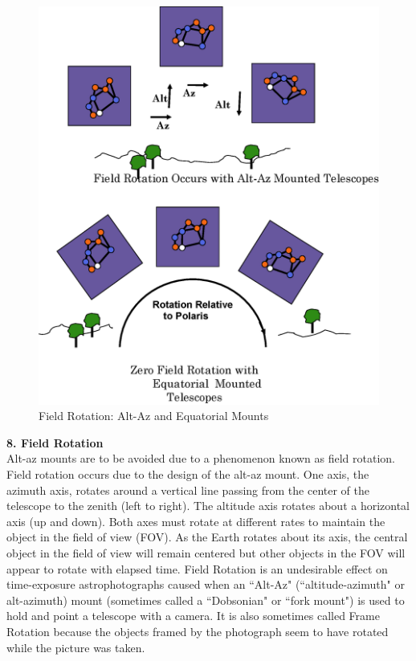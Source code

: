 \documentclass[a4paper,12pt]{extarticle}
\begin{document}
\begin{figure}
	\centering
	\includegraphics[width=\linewidth]{fieldrot.eps}
	\vspace{-1.5cm}
	\caption{Field Rotation: Alt-Az and Equatorial Mounts}
\end{figure}

\textbf{8. Field Rotation}\\

Alt-az mounts are to be avoided due to a phenomenon
known as field rotation. Field rotation occurs due to
the design of the alt-az mount. One axis, the azimuth
axis, rotates around a vertical line passing from the
center of the telescope to the zenith (left to right). The altitude axis rotates about a horizontal axis (up and down). Both axes must rotate at different rates to maintain the object in the field of view (FOV). As the Earth rotates about its axis, the central object in the field of view will remain centered but other objects in the FOV will appear to rotate with elapsed time. Field Rotation is an undesirable effect on time-exposure astrophotographs caused when an ``Alt-Az" (``altitude-azimuth" or alt-azimuth) mount (sometimes called a ``Dobsonian" or ``fork mount") is used to hold and point a telescope with a camera. It is also sometimes called Frame Rotation because the objects framed by the photograph seem to have rotated while the picture was taken.\\
\end{document}
